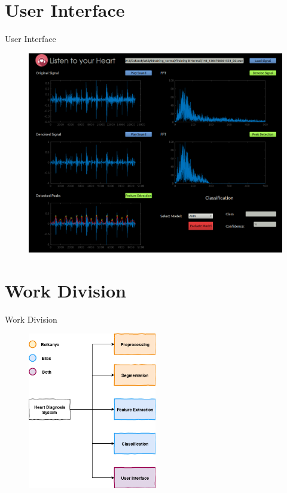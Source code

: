 \documentclass[10pt]{beamer}
\begin{document}
\section{User Interface}
\begin{frame}{User Interface}
\begin{figure}
	\centering
	\includegraphics[scale=0.2]{AAUgraphics/gui.png}
\end{figure}
\end{frame}

\section{Work Division}
\begin{frame}{Work Division}
\begin{figure}
	\centering
	\includegraphics[width=0.5\textwidth]{AAUgraphics/pres1.png}

\end{figure}
\end{frame}
\end{document}
